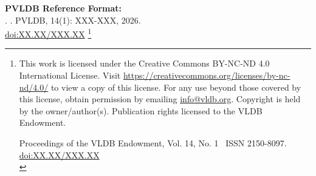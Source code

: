 \documentclass[sigconf, nonacm]{acmart}
\newcommand\vldbdoi{XX.XX/XXX.XX}
\newcommand\vldbpages{XXX-XXX}
\newcommand\vldbvolume{14}
\newcommand\vldbissue{1}
\newcommand\vldbyear{2026}
\newcommand\vldbauthors{\authors}
\newcommand\vldbtitle{\shorttitle}
\newcommand\vldbpagestyle{plain}
\theoremstyle{definition}
\newcommand{\projectname}{{GLM}\xspace}
\begin{document}
\begin{abstract}
\end{abstract}

\maketitle

\pagestyle{\vldbpagestyle}
\begingroup\small\noindent\raggedright\textbf{PVLDB Reference Format:}\\
\vldbauthors. \vldbtitle. PVLDB, \vldbvolume(\vldbissue): \vldbpages, \vldbyear.\\
\href{https://doi.org/\vldbdoi}{doi:\vldbdoi}
\endgroup
\begingroup
\renewcommand\thefootnote{}\footnote{\noindent
This work is licensed under the Creative Commons BY-NC-ND 4.0 International License. Visit \url{https://creativecommons.org/licenses/by-nc-nd/4.0/} to view a copy of this license. For any use beyond those covered by this license, obtain permission by emailing \href{mailto:info@vldb.org}{info@vldb.org}. Copyright is held by the owner/author(s). Publication rights licensed to the VLDB Endowment. \\
\raggedright Proceedings of the VLDB Endowment, Vol. \vldbvolume, No. \vldbissue\ %
ISSN 2150-8097. \\
\href{https://doi.org/\vldbdoi}{doi:\vldbdoi} \\
}\addtocounter{footnote}{-1}\endgroup
\end{document}
